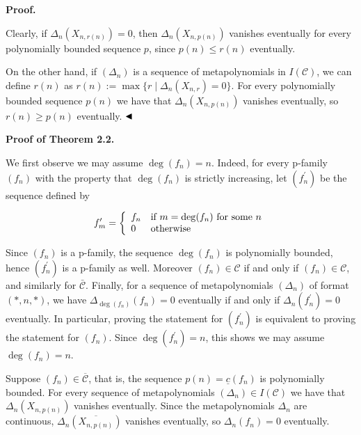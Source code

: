 \documentclass[10pt,a4paper]{article}
\begin{document}
\par\medskip\noindent\textbf{Proof.}\par




Clearly, if $\Delta_{n}(X_{n,r(n)})=0$, then $\Delta_{n}(X_{n,p(n)})$ vanishes eventually for every polynomially bounded sequence $p$, since $p(n)\leq r(n)$ eventually.





On the other hand, if $(\Delta_{n})$ is a sequence of metapolynomials in $I(\mathcal{C})$, we can define $r(n)$ as $r(n):=\max\{r\mid\Delta_{n}(X_{n,r})=0\}$.
For every polynomially bounded sequence $p(n)$ we have that $\Delta_{n}(X_{n,p(n)})$ vanishes eventually, so $r(n)\geq p(n)$ eventually.
$\hfill\blacktriangleleft$






\par\medskip\noindent\textbf{Proof of Theorem 2.2.}\par




We first observe we may assume $\deg(f_{n})=n$. Indeed, for every p-family $(f_{n})$ with the property that $\deg(f_{n})$ is strictly increasing, let $(f^{\prime}_{n})$ be the sequence defined by



\[\begin{aligned}
f^{\prime}_{m}=\left\{\begin{array}[]{ll}f_{n}&\text{if $m=\deg(f_{n})$ for some $n$}\\ 0&\text{otherwise}\end{array}\right.
\end{aligned}\]


Since $(f_{n})$ is a p-family, the sequence $\deg(f_{n})$ is polynomially bounded, hence $(f^{\prime}_{n})$ is a p-family as well. Moreover $(f_{n})\in\mathcal{C}$ if and only if $(f_{n})\in\mathcal{C}$, and similarly for $\bar{\mathcal{C}}$. Finally, for a sequence of metapolynomials $(\Delta_{n})$ of format $(*,n,*)$, we have $\Delta_{\deg(f_{n})}(f_{n})=0$ eventually if and only if $\Delta_{n}(f^{\prime}_{n})=0$ eventually. In particular, proving the statement for $(f^{\prime}_{n})$ is equivalent to proving the statement for $(f_{n})$. Since $\deg(f^{\prime}_{n})=n$, this shows we may assume $\deg(f_{n})=n$.





Suppose $(f_{n})\in\overline{\mathcal{C}}$, that is, the sequence $p(n)=\underline{c}(f_{n})$ is polynomially bounded.
For every sequence of metapolynomials $(\Delta_{n})\in I(\mathcal{C})$ we have that $\Delta_{n}(X_{n,p(n)})$ vanishes eventually.
Since the metapolynomials $\Delta_{n}$ are continuous, $\Delta_{n}(\overline{X_{n,p(n)}})$ vanishes eventually, so $\Delta_{n}(f_{n})=0$ eventually.
\end{document}
